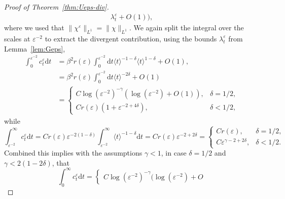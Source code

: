 \documentclass[11pt, a4paper]{scrartcl}
\numberwithin{equation}{section}
\theoremstyle{plain}
\theoremstyle{remark}
\newcommand{\mathd}{\mathrm{d}}
\begin{document}
\begin{proof}[Proof of Theorem~\ref{thm:Ueps-div}]
\[\begin{aligned}
			\lambda_t^{\varepsilon} + O (1)),
		\end{aligned} \]
	where we used that $\| \chi^{\varepsilon} \|_{L^1} = \| \chi \|_{L^1}$. We
	again split the integral over the scales at $\varepsilon^{- 2}$ to extract
	the divergent contribution, using the bounds $\lambda_t^{\varepsilon}$ from
	Lemma~\ref{lem:Geps},
	\[ \begin{aligned}
			\int_0^{\varepsilon^{- 2}} c_t^{\varepsilon} \mathd t & = \beta^2 r
			(\varepsilon)  \int_0^{\varepsilon^{- 2}} \mathd t \langle t \rangle^{-
			1 - \delta} \langle t \rangle^{1 - \delta} + O (1),                                                                              \\
			                                                      & = \beta^2 r (\varepsilon)  \int_0^{\varepsilon^{- 2}} \mathd t
			\langle t \rangle^{- 2 \delta} + O (1)                                                                                           \\
			                                                      & = \begin{cases}
				                                                          C \log (\varepsilon^{- 2})^{- \gamma} (\log (\varepsilon^{- 2}) + O
				                                                          (1)),                                                & \delta = 1 / 2, \\
				                                                          Cr (\varepsilon) (1 + \varepsilon^{- 2 + 4 \delta}), & \delta < 1 /
				                                                          2,
			                                                          \end{cases}
		\end{aligned} \]
	while
	\[ \int_{\varepsilon^{- 2}}^{\infty} c_t^{\varepsilon} \mathd t = Cr
		(\varepsilon) \varepsilon^{- 2 (1 - \delta)}
		\int^{\infty}_{\varepsilon^{- 2}} \langle t \rangle^{- 1 - \delta} \mathd
		t = Cr (\varepsilon) \varepsilon^{- 2 + 2 \delta} = \begin{cases}
			Cr (\varepsilon),                      & \delta = 1 / 2, \\
			C \varepsilon^{\gamma - 2 + 2 \delta}, & \delta < 1 / 2.
		\end{cases} \]
	Combined this implies with the assumptions $\gamma < 1$, in case $\delta = 1
		/ 2$ and $\gamma < 2 (1 - 2 \delta)$, that
	\[ \int_0^{\infty} c_t^{\varepsilon} \mathd t = \left\{\begin{array}{lcl}
			C \log (\varepsilon^{- 2})^{- \gamma} (\log (\varepsilon^{- 2}) + O

\end{array}\]
\end{proof}
\end{document}
